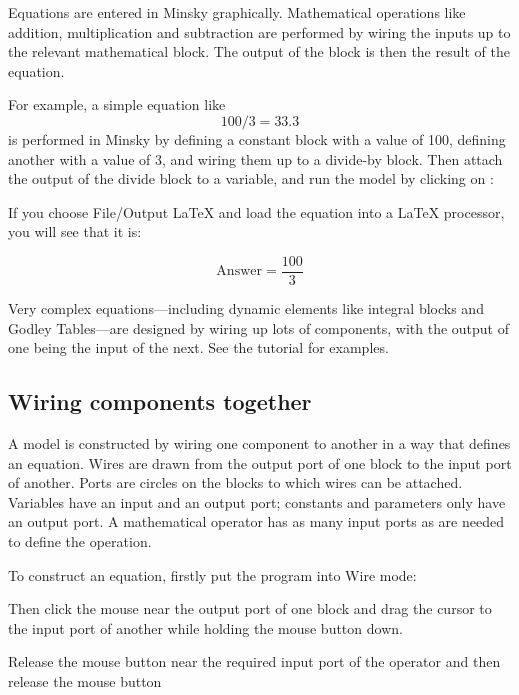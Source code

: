 Equations are entered in Minsky graphically. Mathematical operations
like addition, multiplication and subtraction are performed by wiring
the inputs up to the relevant mathematical block. The output of the
block is then the result of the equation. 

For example, a simple equation like
\begin{displaymath}
100/3 = 33.3
\end{displaymath}
is performed in Minsky by defining a constant block with a value of 100, defining another with a value of 3, and wiring them up to a divide-by block. Then attach the output of the divide block to a variable, and run the model by clicking on :


If you choose File/Output LaTeX and load the equation into a LaTeX processor, you will see that it is:

\begin{displaymath}
\mathrm{Answer}=\frac{100}{3}
\end{displaymath}

Very complex equations---including dynamic elements like integral
blocks and Godley Tables---are designed by wiring up lots of
components, with the output of one being the input of the next. See
the tutorial for examples.

\subsection{Wiring components together}

A model is constructed by wiring one component to another in a way
that defines an equation. Wires are drawn from the output port of one
block to the input port of another. Ports are circles on the blocks to
which wires can be attached. Variables have an input and an output
port; constants and parameters only have an output port. A
mathematical operator has as many input ports as are needed to define
the operation.


To construct an equation, firstly put the program into Wire mode:



Then click the mouse near the output port of one block and drag the
cursor to the input port of another while holding the mouse button
down. 


Release the mouse button near the required input port of the operator
and then release the mouse button

